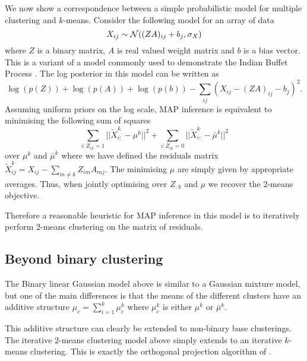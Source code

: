 \documentclass{article}
\numberwithin{equation}{section}
\numberwithin{thm}{section}
\def\IBP{Z}
\def\Weights{A}
\def\Data{X}
\def\Residuals{\tilde{X}}
\def\bias{b}
\def\centre{\mu}
\begin{document}
We now show a correspondence between a simple probabilistic model for multiple clustering and $k$-means.
Consider the following model for an array of data
\begin{equation}
\Data_{ij} \sim \Normal((\IBP\Weights)_{ij} + \bias_{j}, \sigma_\Data)
\end{equation}
where $\IBP$ is a binary matrix, $\Weights$ is real valued weight matrix and $\bias$ is a bias vector. This is a variant of a model commonly used to demonstrate the Indian Buffet Process \citep[e.g.][]{Griffiths2011}. The log posterior in this model can be written as
\begin{equation}
\log(p(\IBP)) + \log(p(\Weights)) + \log(p(\bias)) - \sum_{ij}(\Data_{ij} - (\IBP\Weights)_{ij} - \bias_j)^2.
\end{equation}
Assuming uniform priors on the log scale, MAP inference is equivalent to minimising the following sum of squares
\begin{equation}
\sum_{i: \IBP_{ik} = 1}||\Residuals^k_{i:} - \centre^k||^2 + \sum_{i: \IBP_{ik} = 0}||\Residuals^k_{i:} - \bar{\centre}^k||^2
\end{equation}
over $\centre^k$ and $\bar{\centre}^k$ where we have defined the residuals matrix $\Residuals^k_{ij} = \Data_{ij} - \sum_{m \neq k}\IBP_{im}\Weights_{mj}$.
The minimising $\centre$ are simply given by appropriate averages.
Thus, when jointly optimising over $\IBP_{:k}$ and $\centre$ we recover the $2$-means objective.

Therefore a reasonable heuristic for MAP inference in this model is to iteratively perform $2$-means clustering on the matrix of residuals.

\subsection{Beyond binary clustering}

The Binary linear Gaussian model above is similar to a Gaussian mixture model, but one of the main differences is that the means of the different clusters have an additive structure \ie $\centre_c = \sum_{i=1}^k \centre^k_c$ where $\centre^k_c$ is either $\centre^k$ or $\bar{\centre}^k$.

This additive structure can clearly be extended to non-binary base clusterings.
The iterative $2$-means clustering model above simply extends to an iterative $k$-means clustering.
This is exactly the orthogonal projection algorithm of \cite{Cui2007}.
\end{document}
